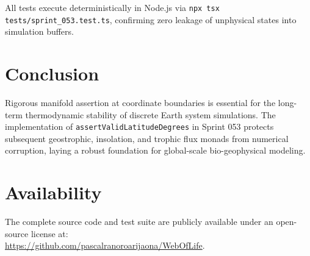 \documentclass[11pt,a4paper]{article}
\begin{document}
All tests execute deterministically in Node.js via \texttt{npx tsx tests/sprint\_053.test.ts}, confirming zero leakage of unphysical states into simulation buffers.

\section{Conclusion}

Rigorous manifold assertion at coordinate boundaries is essential for the long-term thermodynamic stability of discrete Earth system simulations. The implementation of \texttt{assertValidLatitudeDegrees} in Sprint 053 protects subsequent geostrophic, insolation, and trophic flux monads from numerical corruption, laying a robust foundation for global-scale bio-geophysical modeling.

\section*{Availability}
The complete source code and test suite are publicly available under an open-source license at: \\
\url{https://github.com/pascalranoroarijaona/WebOfLife}.
\end{document}
